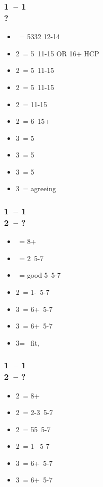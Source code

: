 \subsubsection*{1\spades\ -- 1\ntx\ \\ ?}
\begin{itemize}
    \item \pass\ = 5332 12-14
    \item 2\clubs\ = 5\spades\clubs\ 11-15 OR 16+ HCP \fonce
    \item 2\diams\ = 5\diams\ 11-15
    \item 2\hearts\ = 5\hearts\ 11-15
    \item 2\spades\ = 11-15
    \item 2\ntx\ = 6\minor\ 15+
    \item 3\clubs\ = 5\clubs\ \gf
    \item 3\diams\ = 5\diams\ \gf
    \item 3\hearts\ = 5\hearts\ \gf
    \item 3\spades\ = agreeing \spades\ \gf
\end{itemize}

\subsubsection*{1\hearts\ -- 1\spades\ \\ 2\clubs\ -- ?}
\begin{itemize}
    \item \diams\ = 8+
    \item \hearts\ = 2\hearts\ 5-7
    \item \spades\ = good 5\spades\ 5-7
    \item 2\ntx\ = 1-\hearts\ 5-7
    \item 3\clubs\ = 6+\clubs\ 5-7
    \item 3\diams\ = 6+\diams\ 5-7
    \item 3\hearts = \hearts\ fit, \gf
\end{itemize}

\subsubsection*{1\hearts\ -- 1\ntx\ \\ 2\clubs\ -- ?}
\begin{itemize}
    \item 2\diams\ = 8+
    \item 2\hearts\ = 2-3\hearts\ 5-7
    \item 2\spades\ = 55\minor\ 5-7
    \item 2\nt\ = 1-\hearts\ 5-7
    \item 3\clubs\ = 6+\clubs\ 5-7
    \item 3\diams\ = 6+\diams\ 5-7
\end{itemize}

